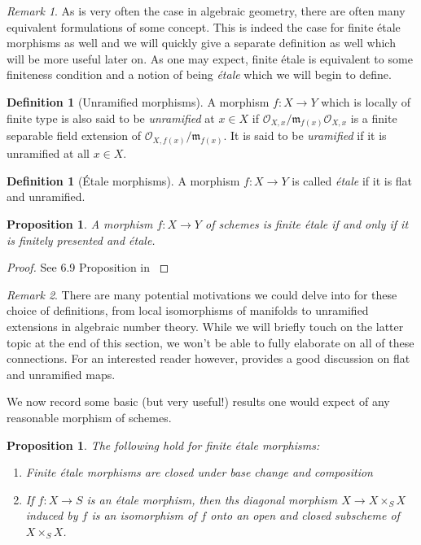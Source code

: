 \documentclass{article}
\theoremstyle{definition}
\newtheorem{definition2}[theorem]{Definition}
\theoremstyle{remark}
\newtheorem*{remark}{Remark}
\theoremstyle{plain}
\newtheorem{proposition}[theorem]{Proposition}
\newcommand{\mc}[1]{\mathcal{#1}}
\newcommand{\mk}[1]{\mathfrak{#1}}
\begin{document}
\begin{remark}
	As is very often the case in algebraic geometry, there are often many equivalent formulations of some concept.
	This is indeed the case for finite \'etale morphisms as well and we will quickly give a separate definition as well which will be more useful later on.
	As one may expect, finite \'etale is equivalent to some finiteness condition and a notion of being \textit{\'etale} which we will begin to define.

\end{remark}

\begin{definition2}[Unramified morphisms]
	A morphism $f: X \to Y$ which is locally of finite type is also said to be \textit{unramified} at $x \in X$ if $\mc{O}_{X,x}/\mk{m}_{f(x)} \mc{O}_{X,x}$ is a finite separable field extension of $\mc{O}_{X, f(x)}/\mk{m}_{f(x)}$.
It is said to be \textit{uramified} if it is unramified at all $x \in X$.
\end{definition2}


\begin{definition2}[\'Etale morphisms]
	A morphism $f: X \to Y$ is called \textit{\'etale} if it is flat and unramified.
\end{definition2}

\begin{proposition}
	A morphism $f: X \to Y$ of schemes is finite \'etale if and only if it is finitely presented and \'etale.
\end{proposition}
\begin{proof}
	See 6.9 Proposition in \cite{Lenstra}
\end{proof}

\begin{remark}
	There are many potential motivations we could delve into for these choice of definitions, from local isomorphisms of manifolds to unramified extensions in algebraic number theory.
While we will briefly touch on the latter topic at the end of this section, we won't be able to fully elaborate on all of these connections.
For an interested reader however, \cite{milneLEC} provides a good discussion on flat and unramified maps. 
\end{remark}

We now record some basic (but very useful!) results one would expect of any reasonable morphism of schemes.

\begin{proposition}
The following hold for finite \'etale morphisms: 
\begin{enumerate}
	\item Finite \'etale morphisms are closed under base change and composition
	\item If $f: X \to S$ is an \'etale morphism, then ths diagonal morphism $X \to X \times_S X$ induced by $f$ is an isomorphism of $f$ onto an open and closed subscheme of $X \times_S X$.
\end{enumerate}
\end{proposition}
\end{document}
